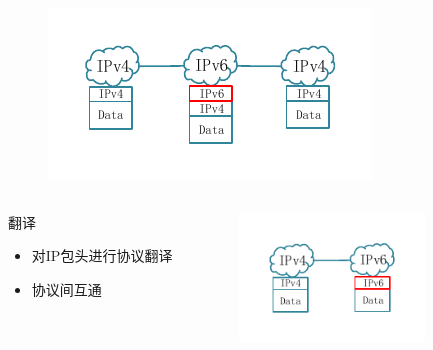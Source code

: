 \documentclass{beamer}
\begin{document}
\begin{frame}
\begin{columns}[T]
\begin{column}{.49\textwidth}
      \vspace{-2em}
      \begin{figure}
        \includegraphics[width=\textwidth]{figs/17-encapsulation.pdf}
      \end{figure}
    \end{column}
  \end{columns}
  \vspace{1em}
  \begin{columns}[T]
    \begin{column}{.4\textwidth}
      \begin{block}{翻译}
        \begin{itemize}
        \item 对IP包头进行协议翻译
        \item 协议间互通
        \end{itemize}
      \end{block}
    \end{column}
    \hfill
    \begin{column}{.49\textwidth}
      \vspace{-2em}
      \begin{figure}
        \includegraphics[width=0.8\textwidth]{figs/18-xlat.pdf}
      \end{figure}
    \end{column}
  \end{columns}
\end{frame}
\end{document}
